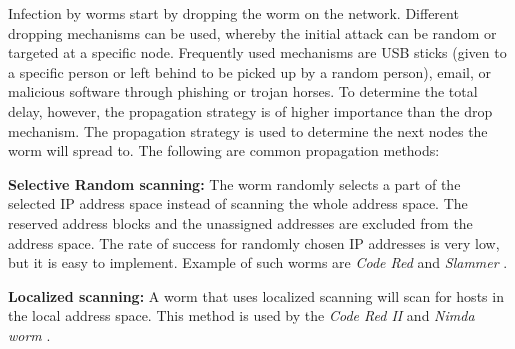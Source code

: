 Infection by worms start by dropping the worm on the network. Different dropping mechanisms can be used, whereby the initial attack can be random or targeted at a specific node. Frequently used mechanisms are USB sticks (given to a specific person or left behind to be picked up by a random person), email, or malicious software through phishing or trojan horses. To determine the total delay, however, the propagation strategy is of higher importance than the drop mechanism. The propagation strategy is used to determine the next nodes the worm will spread to. The following are common propagation methods: 
\begin{description}

\item \textbf{Selective Random scanning:} The worm randomly  selects a part of the selected IP address space instead of scanning the whole address space. The reserved address blocks and the unassigned addresses are excluded from the address space. The rate of success for randomly chosen IP addresses is very low, but it is easy to implement. Example of such worms are \textit{Code Red} \citep{OwnInternetSI} and \textit{Slammer} \citep{moore2003inside}. 

\item \textbf{Localized scanning:} A worm that uses localized scanning will scan for hosts in the local address space. This method is used by the \textit{Code Red II} \citep{OwnInternetSI} and \textit{Nimda worm} \citep{OwnInternetSI}.



\end{description}
